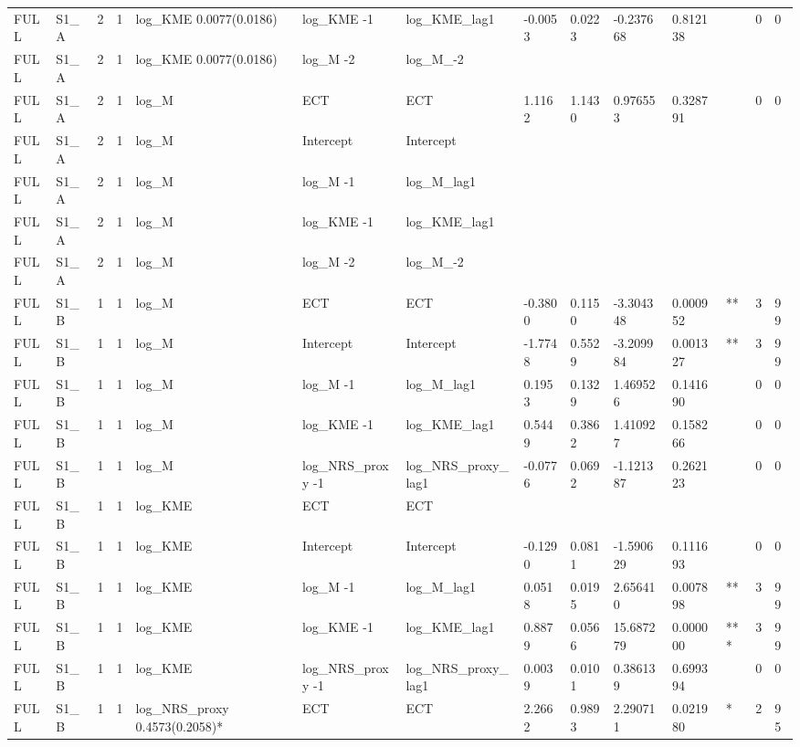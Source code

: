 \begin{tabular}{llllllllllllll}
FULL & S1\_A & 2 & 1 & log\_KME 0.0077(0.0186) & log\_KME -1 & log\_KME\_lag1 & -0.0053 & 0.0223 & -0.237668 & 0.812138 &  & 0 & 0 \\
FULL & S1\_A & 2 & 1 & log\_KME 0.0077(0.0186) & log\_M -2 & log\_M\_-2 &  &  &  &  &  &  &  \\
FULL & S1\_A & 2 & 1 & log\_M & ECT & ECT & 1.1162 & 1.1430 & 0.976553 & 0.328791 &  & 0 & 0 \\
FULL & S1\_A & 2 & 1 & log\_M & Intercept & Intercept &  &  &  &  &  &  &  \\
FULL & S1\_A & 2 & 1 & log\_M & log\_M -1 & log\_M\_lag1 &  &  &  &  &  &  &  \\
FULL & S1\_A & 2 & 1 & log\_M & log\_KME -1 & log\_KME\_lag1 &  &  &  &  &  &  &  \\
FULL & S1\_A & 2 & 1 & log\_M & log\_M -2 & log\_M\_-2 &  &  &  &  &  &  &  \\
FULL & S1\_B & 1 & 1 & log\_M & ECT & ECT & -0.3800 & 0.1150 & -3.304348 & 0.000952 & ** & 3 & 99 \\
FULL & S1\_B & 1 & 1 & log\_M & Intercept & Intercept & -1.7748 & 0.5529 & -3.209984 & 0.001327 & ** & 3 & 99 \\
FULL & S1\_B & 1 & 1 & log\_M & log\_M -1 & log\_M\_lag1 & 0.1953 & 0.1329 & 1.469526 & 0.141690 &  & 0 & 0 \\
FULL & S1\_B & 1 & 1 & log\_M & log\_KME -1 & log\_KME\_lag1 & 0.5449 & 0.3862 & 1.410927 & 0.158266 &  & 0 & 0 \\
FULL & S1\_B & 1 & 1 & log\_M & log\_NRS\_proxy -1 & log\_NRS\_proxy\_lag1 & -0.0776 & 0.0692 & -1.121387 & 0.262123 &  & 0 & 0 \\
FULL & S1\_B & 1 & 1 & log\_KME & ECT & ECT &  &  &  &  &  &  &  \\
FULL & S1\_B & 1 & 1 & log\_KME & Intercept & Intercept & -0.1290 & 0.0811 & -1.590629 & 0.111693 &  & 0 & 0 \\
FULL & S1\_B & 1 & 1 & log\_KME & log\_M -1 & log\_M\_lag1 & 0.0518 & 0.0195 & 2.656410 & 0.007898 & ** & 3 & 99 \\
FULL & S1\_B & 1 & 1 & log\_KME & log\_KME -1 & log\_KME\_lag1 & 0.8879 & 0.0566 & 15.687279 & 0.000000 & *** & 3 & 99 \\
FULL & S1\_B & 1 & 1 & log\_KME & log\_NRS\_proxy -1 & log\_NRS\_proxy\_lag1 & 0.0039 & 0.0101 & 0.386139 & 0.699394 &  & 0 & 0 \\
FULL & S1\_B & 1 & 1 & log\_NRS\_proxy 0.4573(0.2058)* & ECT & ECT & 2.2662 & 0.9893 & 2.290711 & 0.021980 & * & 2 & 95 \\

\end{tabular}
